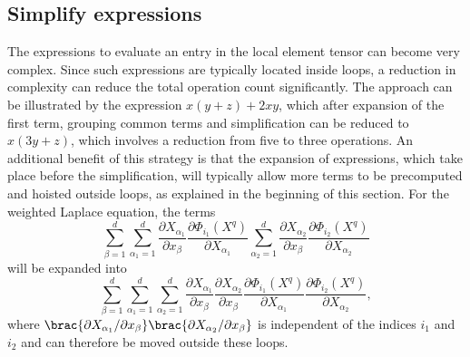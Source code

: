 \subsection{Simplify expressions}
\label{oelgaard-2:sec:simplify_expressions}

The expressions to evaluate an entry in the local element tensor can
become very complex. Since such expressions are typically located inside
loops, a reduction in complexity can reduce the total operation count
significantly.  The approach can be illustrated by the expression
$x (y + z) + 2 x y$, which after expansion of the first term, grouping common
terms and simplification can be reduced to $x (3 y + z)$, which involves
a reduction from five to three operations.  An additional benefit of this
strategy is that the expansion of expressions, which take place before
the simplification, will typically allow more terms to be precomputed
and hoisted outside loops, as explained in the beginning of this section.
For the weighted Laplace equation, the terms
%
\begin{equation}
  \sum_{\beta=1}^d
  \sum_{\alpha_1=1}^d
    \frac{\partial X_{\alpha_1}}{\partial x_{\beta}}
    \frac{\partial \Phi_{i_1}(X^q)}{\partial X_{\alpha_1}}
  \sum_{\alpha_2=1}^d
    \frac{\partial X_{\alpha_2}}{\partial x_{\beta}}
    \frac{\partial \Phi_{i_2}(X^q)}{\partial X_{\alpha_2}}
\end{equation}
%
will be expanded into
%
\begin{equation}
  \sum_{\beta=1}^d
  \sum_{\alpha_1=1}^d
  \sum_{\alpha_2=1}^d
  \frac{\partial X_{\alpha_1}}{\partial x_{\beta}}
  \frac{\partial X_{\alpha_2}}{\partial x_{\beta}}
  \frac{\partial \Phi_{i_1}(X^q)}{\partial X_{\alpha_1}}
  \frac{\partial \Phi_{i_2}(X^q)}{\partial X_{\alpha_2}},
\end{equation}
%
where
$\brac{\partial X_{\alpha_1} / \partial x_{\beta}}
\brac{\partial X_{\alpha_2} / \partial x_{\beta}}$ is independent of the indices
$i_1$ and $i_2$ and can therefore be moved outside these loops.

